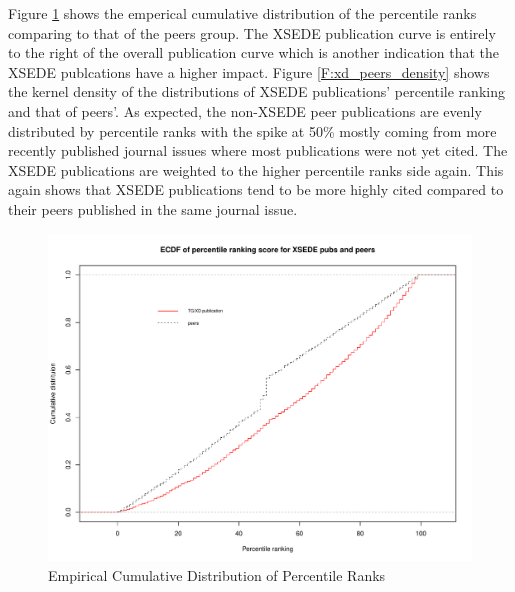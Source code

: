 \documentclass{sig-alternate}
\begin{document}
Figure \ref{F:ptranking_cdf} shows the emperical cumulative
distribution of the percentile ranks comparing to that of the peers
group. The XSEDE publication curve is entirely to the right of the
overall publication curve which is another indication that the XSEDE
publcations have a higher impact.  Figure \ref{F:xd_peers_density}
shows the kernel density of the distributions of XSEDE publications'
percentile ranking and that of peers'. As expected, the non-XSEDE peer
publications are evenly distributed by percentile ranks with the spike
at 50\% mostly coming from more recently published journal issues
where most publications were not yet cited. The XSEDE publications are
weighted to the higher percentile ranks side again. This again shows
that XSEDE publications tend to be more highly cited compared to their
peers published in the same journal issue.

\begin{figure}[htb!]
    \includegraphics[width=0.95\columnwidth]{images/ptranking_CDF.pdf}
    \caption{Empirical Cumulative Distribution of Percentile Ranks}
    \label{F:ptranking_cdf}
\end{figure}
\end{document}
